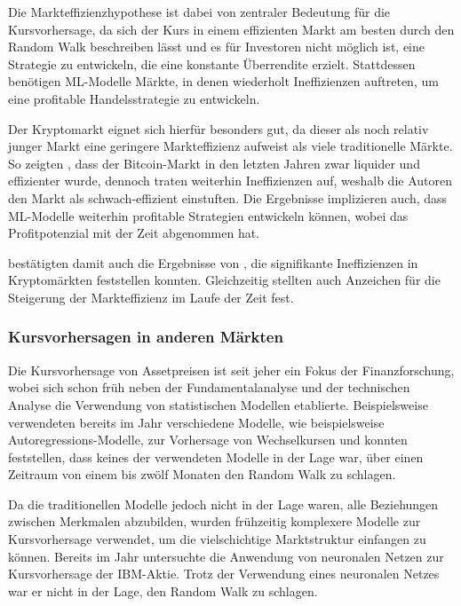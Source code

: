 \documentclass[a4paper, 12pt]{article}
\begin{document}
Die Markteffizienzhypothese ist dabei von zentraler Bedeutung für die Kursvorhersage, da sich der Kurs in einem effizienten Markt am besten durch den Random Walk beschreiben lässt und es für Investoren nicht möglich ist, eine Strategie zu entwickeln, die eine konstante Überrendite erzielt.
Stattdessen benötigen ML-Modelle Märkte, in denen wiederholt Ineffizienzen auftreten, um eine profitable Handelsstrategie zu entwickeln. 

Der Kryptomarkt eignet sich hierfür besonders gut, da dieser als noch relativ junger Markt eine geringere Markteffizienz aufweist als viele traditionelle Märkte.
So zeigten \textcite{Yi_2023}, dass der Bitcoin-Markt in den letzten Jahren zwar liquider und effizienter wurde, dennoch traten weiterhin Ineffizienzen auf, weshalb die Autoren den Markt als schwach-effizient einstuften.
Die Ergebnisse implizieren auch, dass ML-Modelle weiterhin profitable Strategien entwickeln können, wobei das Profitpotenzial mit der Zeit abgenommen hat.

\citeauthor{Yi_2023} bestätigten damit auch die Ergebnisse von \textcite{Tran2020}, die signifikante Ineffizienzen in Kryptomärkten feststellen konnten.
Gleichzeitig stellten \citeauthor{Tran2020} auch Anzeichen für die Steigerung der Markteffizienz im Laufe der Zeit fest.

\subsubsection{Kursvorhersagen in anderen Märkten}
Die Kursvorhersage von Assetpreisen ist seit jeher ein Fokus der Finanzforschung, wobei sich schon früh neben der Fundamentalanalyse und der technischen Analyse die Verwendung von statistischen Modellen etablierte.
Beispielsweise verwendeten \citeauthor{Meese1983} bereits im Jahr \citeyear{Meese1983} verschiedene Modelle, wie beispielsweise Autoregressions-Modelle, zur Vorhersage von Wechselkursen und konnten feststellen, dass keines der verwendeten Modelle in der Lage war, über einen Zeitraum von einem bis zwölf Monaten den Random Walk zu schlagen.

Da die traditionellen Modelle jedoch nicht in der Lage waren, alle Beziehungen zwischen Merkmalen abzubilden, wurden frühzeitig komplexere Modelle zur Kursvorhersage verwendet, um die vielschichtige Marktstruktur einfangen zu können.
Bereits im Jahr \citeyear{White1988} untersuchte \citeauthor{White1988} die Anwendung von neuronalen Netzen zur Kursvorhersage der IBM-Aktie.
Trotz der Verwendung eines neuronalen Netzes war er nicht in der Lage, den Random Walk zu schlagen.
 
\end{document}
